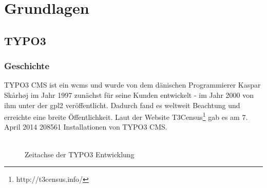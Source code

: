 \chapter{Grundlagen}
\label{ch:basics}


	
\section{TYPO3}
	\subsection{Geschichte}
TYPO3 CMS ist ein \gls{wcms} und wurde von dem dänischen Programmierer Kaspar Skårhøj im Jahr 1997 zunächst für seine Kunden entwickelt - im Jahr 2000 von ihm unter der \gls{gpl2} veröffentlicht. Dadurch fand es weltweit Beachtung und erreichte eine breite Öffentlichkeit. Laut der Website T3Census\footnote{http://t3census.info/} gab es am 7. April 2014 208561 Installationen von TYPO3 CMS.
\\
\\
		\begin{figure}[h!]
			\startchronology[startyear=1995, stopyear=2015]
			\stopchronology
			\caption{Zeitachse der TYPO3 Entwicklung}
		\end{figure}

